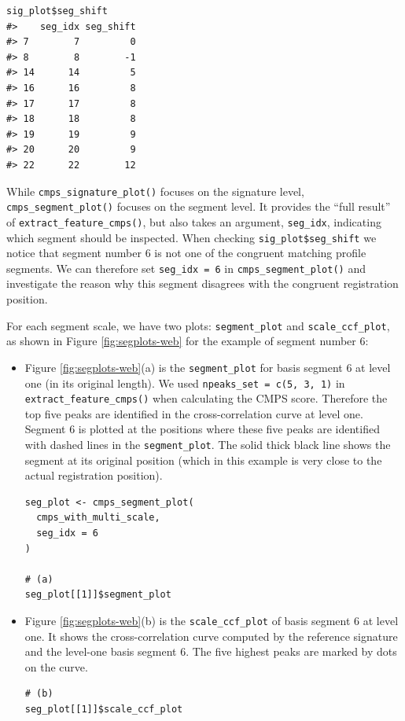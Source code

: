 \begin{verbatim}
sig_plot$seg_shift
#>    seg_idx seg_shift
#> 7        7         0
#> 8        8        -1
#> 14      14         5
#> 16      16         8
#> 17      17         8
#> 18      18         8
#> 19      19         9
#> 20      20         9
#> 22      22        12
\end{verbatim}

While \texttt{cmps\_signature\_plot()} focuses on the signature level, \texttt{cmps\_segment\_plot()} focuses on the segment level.
It provides the ``full result'' of \texttt{extract\_feature\_cmps()}, but also takes an argument, \texttt{seg\_idx}, indicating which segment should be inspected.
When checking \texttt{sig\_plot\$seg\_shift} we notice that segment number 6 is not one of the congruent matching profile segments.
We can therefore set \texttt{seg\_idx\ =\ 6} in \texttt{cmps\_segment\_plot()} and investigate the reason why this segment disagrees with the congruent registration position.

For each segment scale, we have two plots: \texttt{segment\_plot} and \texttt{scale\_ccf\_plot}, as shown in Figure \ref{fig:segplots-web} for the example of segment number 6:

\begin{itemize}
\item
  Figure \ref{fig:segplots-web}(a) is the \texttt{segment\_plot} for basis segment 6 at level one (in its original length). We used \texttt{npeaks\_set\ =\ c(5,\ 3,\ 1)} in \texttt{extract\_feature\_cmps()} when calculating the CMPS score. Therefore the top five peaks are identified in the cross-correlation curve at level one. Segment 6 is plotted at the positions where these five peaks are identified with dashed lines in the \texttt{segment\_plot}. The solid thick black line shows the segment at its original position (which in this example is very close to the actual registration position).

\begin{verbatim}
seg_plot <- cmps_segment_plot(
  cmps_with_multi_scale,
  seg_idx = 6
)

# (a)
seg_plot[[1]]$segment_plot
\end{verbatim}
\item
  Figure \ref{fig:segplots-web}(b) is the \texttt{scale\_ccf\_plot} of basis segment 6 at level one. It shows the cross-correlation curve computed by the reference signature and the level-one basis segment 6. The five highest peaks are marked by dots on the curve.

\begin{verbatim}
# (b)
seg_plot[[1]]$scale_ccf_plot
\end{verbatim}
\end{itemize}

